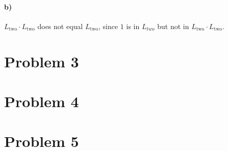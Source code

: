 \documentclass[12pt]{article}
\begin{document}
\paragraph{b)}

\(L_\text{two}\cdot L_\text{two}\) does not equal \(L_\text{two}\), since \(1\) is in \(L_{two}\) but not in \(L_\text{two}\cdot L_\text{two}\).

\section*{Problem 3}

\section*{Problem 4}

\section*{Problem 5}
\end{document}
